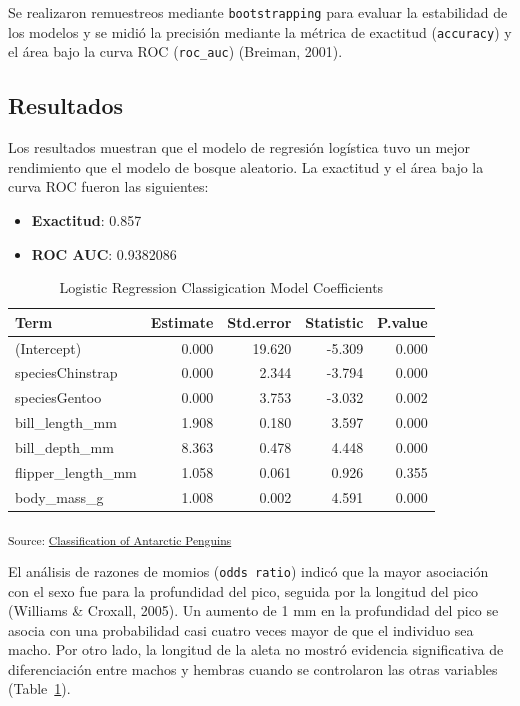 \documentclass[
]{agujournal2019}
\providecommand{\tightlist}{%
  \setlength{\itemsep}{0pt}\setlength{\parskip}{0pt}}\usepackage{longtable,booktabs,array}
\begin{document}
Se realizaron remuestreos mediante \texttt{bootstrapping} para evaluar
la estabilidad de los modelos y se midió la precisión mediante la
métrica de exactitud (\texttt{accuracy}) y el área bajo la curva ROC
(\texttt{roc\_auc}) (Breiman, 2001).

\subsection{Resultados}\label{resultados}

Los resultados muestran que el modelo de regresión logística tuvo un
mejor rendimiento que el modelo de bosque aleatorio. La exactitud y el
área bajo la curva ROC fueron las siguientes:

\begin{itemize}
\tightlist
\item
  \textbf{Exactitud}: 0.857\\
\item
  \textbf{ROC AUC}: 0.9382086
\end{itemize}

\begin{longtable}[]{@{}lrrrr@{}}

\caption{\label{tbl-res}Logistic Regression Classigication Model
Coefficients}

\tabularnewline

\toprule\noalign{}
Term & Estimate & Std.error & Statistic & P.value \\
\midrule\noalign{}
\endhead
\bottomrule\noalign{}
\endlastfoot
(Intercept) & 0.000 & 19.620 & -5.309 & 0.000 \\
speciesChinstrap & 0.000 & 2.344 & -3.794 & 0.000 \\
speciesGentoo & 0.000 & 3.753 & -3.032 & 0.002 \\
bill\_length\_mm & 1.908 & 0.180 & 3.597 & 0.000 \\
bill\_depth\_mm & 8.363 & 0.478 & 4.448 & 0.000 \\
flipper\_length\_mm & 1.058 & 0.061 & 0.926 & 0.355 \\
body\_mass\_g & 1.008 & 0.002 & 4.591 & 0.000 \\

\end{longtable}

\textsubscript{Source:
\href{https://quarto-ext.github.io/manuscript-template-rstudio/notebooks/ClassificationModel-preview.html\#cell-tbl-res}{Classification
of Antarctic Penguins}}

El análisis de razones de momios (\texttt{odds\ ratio}) indicó que la
mayor asociación con el sexo fue para la profundidad del pico, seguida
por la longitud del pico (Williams \& Croxall, 2005). Un aumento de 1 mm
en la profundidad del pico se asocia con una probabilidad casi cuatro
veces mayor de que el individuo sea macho. Por otro lado, la longitud de
la aleta no mostró evidencia significativa de diferenciación entre
machos y hembras cuando se controlaron las otras variables
(Table~\ref{tbl-res}).
\end{document}

